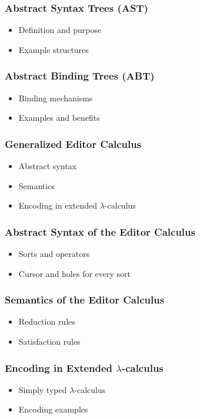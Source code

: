 \documentclass[t,24pt,aspectratio=169]{beamer}
\begin{document}
\begin{frame}[hvid]
    \frametitle{Abstract Syntax Trees (AST)}
    \begin{itemize}
        \item Definition and purpose
        \item Example structures
    \end{itemize}
\end{frame}

\begin{frame}[hvid]
    \frametitle{Abstract Binding Trees (ABT)}
    \begin{itemize}
        \item Binding mechanisms
        \item Examples and benefits
    \end{itemize}
\end{frame}

\begin{frame}[hvid]
    \frametitle{Generalized Editor Calculus}
    \begin{itemize}
        \item Abstract syntax
        \item Semantics
        \item Encoding in extended $\lambda$-calculus
    \end{itemize}
\end{frame}

\begin{frame}[hvid]
    \frametitle{Abstract Syntax of the Editor Calculus}
    \begin{itemize}
        \item Sorts and operators
        \item Cursor and holes for every sort
    \end{itemize}
\end{frame}

\begin{frame}[hvid]
    \frametitle{Semantics of the Editor Calculus}
    \begin{itemize}
        \item Reduction rules
        \item Satisfaction rules
    \end{itemize}
\end{frame}

\begin{frame}[hvid]
    \frametitle{Encoding in Extended $\lambda$-calculus}
    \begin{itemize}
        \item Simply typed $\lambda$-calculus
        \item Encoding examples
    \end{itemize}
\end{frame}
\end{document}
